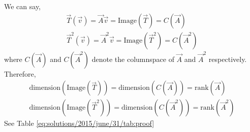 We can say,
\begin{align}
    \vec{T}(\vec{v}) = \vec{A}\vec{v} = \text{Image}(\vec{T}) = C(\vec{A})\\
    \vec{T}^2(\vec{v}) = \vec{A}^2\vec{v} = \text{Image}(\vec{T}^2) = C(\vec{A}^2)
\end{align}
where $C(\vec{A})$ and $C(\vec{A}^2)$ denote the columnspace of $\vec{A}$ and $\vec{A}^2$ respectively. Therefore,
\begin{align}
    \text{dimension}(\text{Image}(\vec{T})) = \text{dimension}(C(\vec{A})) = \text{rank}(\vec{A})\\
    \text{dimension}(\text{Image}(\vec{T}^2)) = \text{dimension}(C(\vec{A}^2)) = \text{rank}(\vec{A}^2)
\end{align}
See Table     \ref{eq:solutions/2015/june/31/tab:proof}

